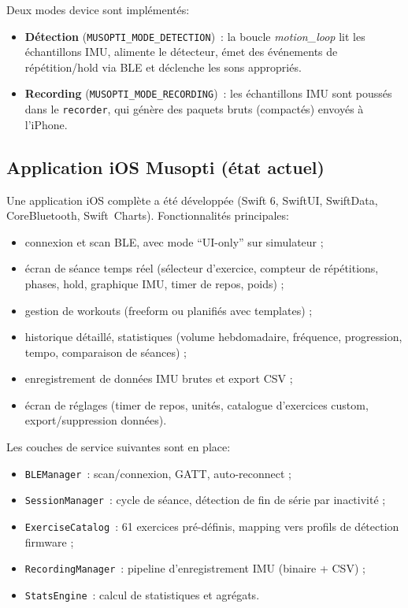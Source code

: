 \documentclass[a4paper,11pt]{article}
\begin{document}
Deux modes device sont implémentés:
\begin{itemize}
  \item \textbf{Détection} (\texttt{MUSOPTI\_MODE\_DETECTION})~: la boucle \emph{motion\_loop} lit les échantillons IMU, alimente le détecteur, émet des événements de répétition/hold via BLE et déclenche les sons appropriés.
  \item \textbf{Recording} (\texttt{MUSOPTI\_MODE\_RECORDING})~: les échantillons IMU sont poussés dans le \texttt{recorder}, qui génère des paquets bruts (compactés) envoyés à l'iPhone.
\end{itemize}

\subsection{Application iOS Musopti (état actuel)}

Une application iOS complète a été développée (Swift 6, SwiftUI, SwiftData, CoreBluetooth, Swift~Charts). Fonctionnalités principales:
\begin{itemize}
  \item connexion et scan BLE, avec mode ``UI-only'' sur simulateur ;
  \item écran de séance temps réel (sélecteur d'exercice, compteur de répétitions, phases, hold, graphique IMU, timer de repos, poids) ;
  \item gestion de workouts (freeform ou planifiés avec templates) ;
  \item historique détaillé, statistiques (volume hebdomadaire, fréquence, progression, tempo, comparaison de séances) ;
  \item enregistrement de données IMU brutes et export CSV ;
  \item écran de réglages (timer de repos, unités, catalogue d'exercices custom, export/suppression données).
\end{itemize}

Les couches de service suivantes sont en place:
\begin{itemize}
  \item \texttt{BLEManager}~: scan/connexion, GATT, auto-reconnect ;
  \item \texttt{SessionManager}~: cycle de séance, détection de fin de série par inactivité ;
  \item \texttt{ExerciseCatalog}~: 61 exercices pré-définis, mapping vers profils de détection firmware ;
  \item \texttt{RecordingManager}~: pipeline d'enregistrement IMU (binaire + CSV) ;
  \item \texttt{StatsEngine}~: calcul de statistiques et agrégats.
\end{itemize}
\end{document}
